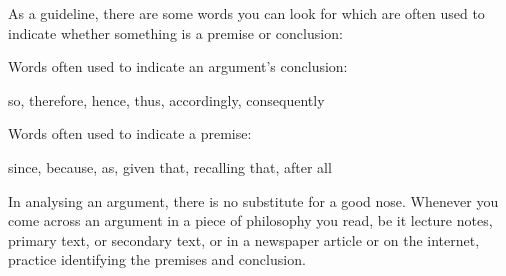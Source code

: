 As a guideline, there are some words you can look for which are often used to indicate whether something is a premise or conclusion:
	\begin{highlighted}
	Words often used to indicate an argument's conclusion:
		\begin{center}
			so, therefore, hence, thus, accordingly, consequently
		\end{center}
	Words often used to indicate a premise:
		\begin{center}
			since, because, as, given that, recalling that, after all
		\end{center}
	\end{highlighted}







In analysing an argument, there is no substitute for a good nose.
Whenever you come across an argument in a
piece of philosophy you read, be it lecture notes,
primary text, or secondary text, or in a newspaper
article or on the internet, practice identifying the
premises and conclusion.

